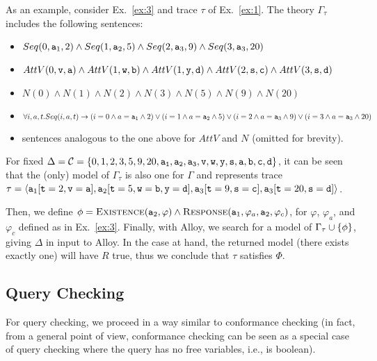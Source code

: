 \begin{example}\label{ex:alloy-c-check}
As an example, consider Ex.~\ref{ex:3} and trace $\tau$ of
Ex.~\ref{ex:1}.
The theory $\Gamma_\tau$ includes the following sentences:
\begin{itemize}
	\item $
		Seq(0,\mathtt{a}_1, 2)\land
		Seq(1,\mathtt{a}_2, 5)\land
		Seq(2,\mathtt{a}_3, 9)\land
		Seq(3,\mathtt{a}_3, 20)$
		
	\item $
		AttV(0,\mathtt{v}, \mathtt{a})\land
		AttV(1,\mathtt{w}, \mathtt{b})\land
		AttV(1,\mathtt{y}, \mathtt{d})\land
		AttV(2,\mathtt{s}, \mathtt{c})\land
		AttV(3,\mathtt{s}, \mathtt{d})$
		
	\item $N(0)\land
			N(1)\land
			N(2)\land
			N(3)\land
			N(5)\land
			N(9)\land
			N(20)$		
			
	\item $\forall i,a,t.Seq(i,a,t)\rightarrow
		(i=0\land a= \mathtt{a}_1\land 2)\lor
		(i=1\land a= \mathtt{a}_2\land 5)\lor
		(i=2\land a= \mathtt{a}_3\land 9)\lor
		(i=3\land a= \mathtt{a}_3\land 20)$
		
	\item sentences analogous to the one above for
	$AttV$ and $N$ (omitted for brevity).
\end{itemize}
For fixed $\Delta=\mathcal{C}=
			\{0,1,2,3,5,9,20,
					\mathtt{a_1},\mathtt{a_2},\mathtt{a_3},
					\mathtt{v},\mathtt{w}, \mathtt{y},\mathtt{s},
					\mathtt{a},\mathtt{b},\mathtt{c},\mathtt{d}
				\}
		$,
		it can be seen that the (only) model of $\Gamma_\tau$
		is also one for $\Gamma$ and represents trace
$\tau=\langle\mathtt{a}_1[
	\mathtt{t}=2,
	\mathtt{v}=\mathtt{a}
],
\mathtt{a}_2[
	\mathtt{t}=5,
	\mathtt{w}=\mathtt{b},
	\mathtt{y}=\mathtt{d}
],
\mathtt{a}_3[
	\mathtt{t}=9,
	\mathtt{s}=\mathtt{c}
],
\mathtt{a}_3[
	\mathtt{t}=20,
	\mathtt{s}=\mathtt{d}
]\rangle$.

Then, we define
$\phi=\textsc{Existence}(\mathtt{a}_2,\varphi)\land
\textsc{Response}(\mathtt{a}_1,\varphi_a,\mathtt{a}_2,\varphi_c)$,
for $\varphi$, $\varphi_a$, and $\varphi_c$ defined as
in Ex.~\ref{ex:3}.
Finally, with Alloy, we search for a model of
$\Gamma_\tau\cup\{\phi\}$, giving $\Delta$ in input to Alloy.
In the case at hand, the returned model (there exists
exactly one) will have $R$ true, thus we conclude that
$\tau$ satisfies $\Phi$.
\end{example}



\subsection{Query Checking}
For query checking, we proceed in a way similar to
conformance checking (in fact, from a general point of
view, conformance checking can be seen as a special case
of query checking where the query has no free
variables, i.e., is boolean).

